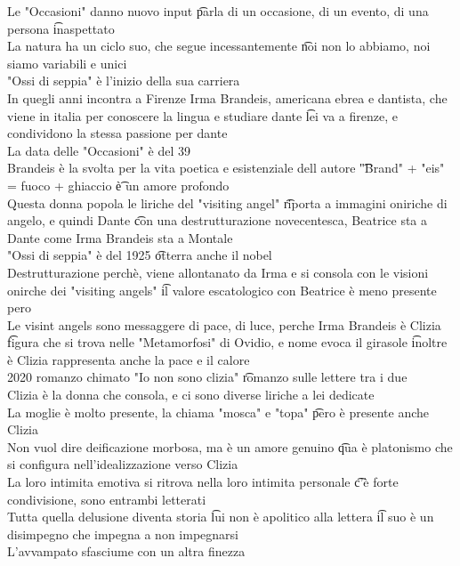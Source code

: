 \documentclass[12pt]{article}
\begin{document}
\s[Montale]
Le "Occasioni" danno nuovo input \t parla di un occasione, di un evento, di una persona \t inaspettato \\
La natura ha un ciclo suo, che segue incessantemente \t noi non lo abbiamo, noi siamo variabili e unici \\
"Ossi di seppia" è l'inizio della sua carriera \\
In quegli anni incontra a Firenze Irma Brandeis, americana ebrea e dantista, che viene in italia per conoscere la lingua e studiare dante \t lei va a firenze, e condividono la stessa passione per dante \\
La data delle "Occasioni" è del 39 \\
Brandeis è la svolta per la vita poetica e esistenziale dell autore \t "Brand" + "eis" = fuoco + ghiaccio \t è un amore profondo \\
Questa donna popola le liriche del "visiting angel" \t riporta a immagini oniriche di angelo, e quindi Dante \t con una destrutturazione novecentesca, Beatrice sta a Dante come Irma Brandeis sta a Montale \\
"Ossi di seppia" è del 1925 \t otterra anche il nobel \\
Destrutturazione perchè, viene allontanato da Irma e si consola con le visioni onirche dei "visiting angels" \t il valore escatologico con Beatrice è meno presente pero \\
Le visint angels sono messaggere di pace, di luce, perche Irma Brandeis è Clizia \t figura che si trova nelle "Metamorfosi" di Ovidio, e nome evoca il girasole \t inoltre è Clizia rappresenta anche la pace e il calore \\
2020 romanzo chimato "Io non sono clizia" \t romanzo sulle lettere tra i due \\
Clizia è la donna che consola, e ci sono diverse liriche a lei dedicate \\
La moglie è molto presente, la chiama "mosca" e "topa" \t pero è presente anche Clizia \\
Non vuol dire deificazione morbosa, ma è un amore genuino \t qua è platonismo che si configura nell'idealizzazione verso Clizia \\
La loro intimita emotiva si ritrova nella loro intimita personale \t c'è forte condivisione, sono entrambi letterati \\
Tutta quella delusione diventa storia \t lui non è apolitico alla lettera \t il suo è un disimpegno che impegna a non impegnarsi \\
L'avvampato sfasciume con un altra finezza
\end{document}
